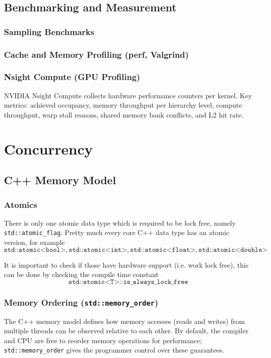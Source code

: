 \documentclass{article}
\begin{document}
\subsection{Benchmarking and Measurement}
\subsubsection{Sampling Benchmarks}
\subsubsection{Cache and Memory Profiling (perf, Valgrind)}
\subsubsection{Nsight Compute (GPU Profiling)}
NVIDIA Nsight Compute collects hardware performance counters per kernel. Key metrics: achieved occupancy, memory throughput per hierarchy level, compute throughput, warp stall reasons, shared memory bank conflicts, and L2 hit rate.

\newpage
\section{Concurrency}
\subsection{C++ Memory Model}
\subsubsection{Atomics}
There is only one atomic data type which is required to be lock free, namely \texttt{std::atomic\_flag}. Pretty much every core C++ data type has an atomic version, for example
\[
    \texttt{std::atomic<bool>}, \texttt{std::atomic<int>}, \texttt{std::atomic<float>}, \texttt{std::atomic<double>}
\]

It is important to check if those have hardware support (i.e. work lock free), this can be done by checking the compile time constant
\[
    \texttt{std::atomic<T>::is\_always\_lock\_free}
\]

\subsubsection{Memory Ordering (\texttt{std::memory\_order})}
The C++ memory model defines how memory accesses (reads and writes) from multiple threads can be observed relative to each other. By default, the compiler and CPU are free to reorder memory operations for performance; \texttt{std::memory\_order} gives the programmer control over these guarantees.
\end{document}

